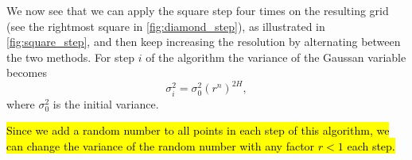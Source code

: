 \begin{enumerate}
\end{enumerate}

We now see that we can apply the square step four times on the resulting grid (see the rightmost square in \cref{fig:diamond_step}), as illustrated in \cref{fig:square_step}, and then keep increasing the resolution by alternating between the two methods. For step $i$ of the algorithm the variance of the Gaussan variable becomes
\begin{equation}
    \sigma_i^2 = \sigma_0^2\left(r^n\right)^{2H},
\end{equation}
where $\sigma_0^2$ is the initial variance.

\hl{Since we add a random number to all points in each step of this algorithm, we can change the variance of the random number with any factor $r<1$ each step.}

% 
% 

